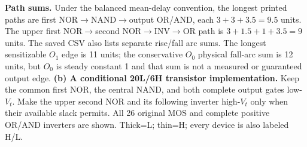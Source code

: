\documentclass[10pt]{article}
\begin{document}
\textbf{Path sums.} Under the balanced mean-delay convention, the longest printed paths are first NOR$\to$NAND$\to$output OR/AND, each $3+3+3.5=9.5$ units. The upper first NOR$\to$second NOR$\to$INV$\to$OR path is $3+1.5+1+3.5=9$ units. The saved CSV also lists separate rise/fall arc sums. The longest sensitizable $O_1$ edge is 11 units; the conservative $O_0$ physical fall-arc sum is 12 units, but $O_0$ is steady constant 1 and that sum is not a measured or guaranteed output edge.
\newpage
\textbf{(b) A conditional 20L/6H transistor implementation.}
Keep the common first NOR, the central NAND, and both complete output gates low-$V_t$. Make the upper second NOR and its following inverter high-$V_t$ only when their available slack permits. All 26 original MOS and complete positive OR/AND inverters are shown. Thick=L; thin=H; every device is also labeled H/L.
\end{document}
